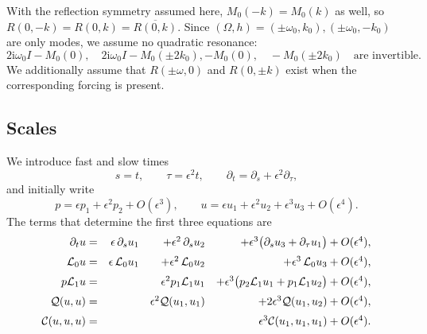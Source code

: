 \documentclass[11pt]{article}
\newcommand{\ii}{\mathrm{i}}
\newcommand{\cQ}{\mathcal{Q}}
\newcommand{\cC}{\mathcal{C}}
\newcommand{\cL}{\mathcal{L}}
\begin{document}
With the reflection symmetry assumed here, $M_0(-k)=M_0(k)$ as well, so
$R(0,-k)=R(0,k)=\overline{R(0,k)}$. Since $(\Omega,h)=(\pm\omega_0, k_0),(\pm\omega_0, -k_0)$ are only modes, we assume no quadratic resonance:
\begin{equation}
 2\ii\omega_0I-M_0(0),\quad 2\ii\omega_0I-M_0(\pm2k_0), -M_0(0),\quad -M_0(\pm2k_0)
 \quad\text{are invertible.}
 \label{eq:no-quadratic-resonance}
\end{equation}
We additionally assume that $R(\pm\omega,0)$ and $R(0,\pm k)$ exist when the corresponding forcing is present. 

\subsection{Scales}
We introduce fast and slow times
\begin{equation}
 s=t,
 \qquad \tau=\epsilon^2t,
 \qquad \partial_t=\partial_s+\epsilon^2\partial_\tau,
 \label{eq:slow-time}
\end{equation}
and initially write
\begin{equation}
 p=\epsilon p_1+\epsilon^2p_2+O(\epsilon^3),
 \qquad
 u=\epsilon u_1+\epsilon^2u_2+\epsilon^3u_3+O(\epsilon^4).
 \label{eq:expansions}
\end{equation}
The terms that determine the first three equations are
\begin{equation}
\begin{array}{r r r r}
\partial_t u=
& \epsilon\,\partial_s u_1
&+ \epsilon^2\,\partial_s u_2
&+ \epsilon^3\bigl(\partial_s u_3+\partial_\tau u_1\bigr)
+ O(\epsilon^4),
\\[2mm]
\cL_0u=
& \epsilon\,\cL_0u_1
&+ \epsilon^2\,\cL_0u_2
&+ \epsilon^3\,\cL_0u_3
+ O(\epsilon^4),
\\[2mm]
p\cL_1u=
&
& \epsilon^2 p_1\cL_1u_1
&+ \epsilon^3\bigl(p_2\cL_1u_1+p_1\cL_1u_2\bigr)
+ O(\epsilon^4),
\\[2mm]
\cQ(u,u)=
&
&\epsilon^2\cQ(u_1,u_1)
&+ 2\epsilon^3\cQ(u_1,u_2)
+ O(\epsilon^4),
\\[2mm]
\cC(u,u,u)=
&
&
&\epsilon^3\cC(u_1,u_1,u_1)
+ O(\epsilon^4).
\end{array}
\end{equation}
\end{document}
